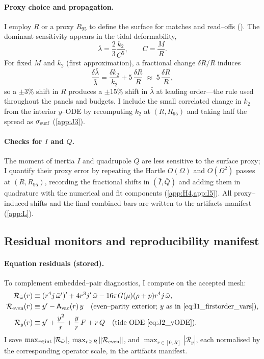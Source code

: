 \documentclass{iopjournal}
\begin{document}
\paragraph{Proxy choice and propagation.}
I employ $R$ or a proxy $R_{95}$ to define the surface for matches and read–offs (). The dominant sensitivity appears in the tidal deformability,
\[
\bar\lambda=\frac{2}{3}\frac{k_2}{C^{5}},\qquad C=\frac{M}{R}.
\]
For fixed $M$ and $k_2$ (first approximation), a fractional change $\delta R/R$ induces
\[
\frac{\delta\bar\lambda}{\bar\lambda}
=\frac{\delta k_2}{k_2}+5\,\frac{\delta R}{R}
\;\approx\;5\,\frac{\delta R}{R},
\]
so a $\pm3\%$ shift in $R$ produces a $\pm15\%$ shift in $\bar\lambda$ at leading order—the rule used throughout the panels and budgets. I include the small correlated change in $k_2$ from the interior $y$–ODE by recomputing $k_2$ at $(R,R_{95})$ and taking half the spread as $\sigma_{\rm surf}$ (\cref{app:J3}).

\paragraph{Checks for $I$ and $Q$.}
The moment of inertia $I$ and quadrupole $Q$ are less sensitive to the surface proxy; I quantify their proxy error by repeating the Hartle $O(\Omega)$ and $O(\Omega^2)$ passes at $(R,R_{95})$, recording the fractional shifts in $(\bar{I},\bar{Q})$ and adding them in quadrature with the numerical and fit components (\cref{app:H4,app:I5}). All proxy–induced shifts and the final combined bars are written to the artifacts manifest (\cref{app:L}).

\subsection{Residual monitors and reproducibility manifest}\label{app:K4}
\paragraph{Equation residuals (stored).}
To complement embedded–pair diagnostics, I compute on the accepted mesh:
\begin{align}
\mathcal R_{\bar\omega}(r)&\equiv(r^{4}j\,\bar\omega')'+4r^{3}j'\,\bar\omega-16\pi G(\mu)(\rho+p)r^{4}j\,\bar\omega,
\label{eq:K4_Rdrag}\\
\mathcal R_{\rm even}(r)&\equiv y'-\mathsf A_{\rm vac}(r)\,y\quad\text{(even–parity exterior; $y$ as in \eqref{eq:I1_firstorder_vars})},
\label{eq:K4_Reven}\\
\mathcal R_{y}(r)&\equiv y'+\frac{y^2}{r}+\frac{y}{r}\,F+r\,Q\quad\text{(tide ODE \eqref{eq:J2_yODE})}.
\label{eq:K4_Ry}
\end{align}
I save $\max_{r\in{\rm int}}|\mathcal R_{\bar\omega}|$, $\max_{r\ge R}\|\mathcal R_{\rm even}\|$, and $\max_{r\in[0,R]}|\mathcal R_{y}|$, each normalised by the corresponding operator scale, in the artifacts manifest.
\end{document}
